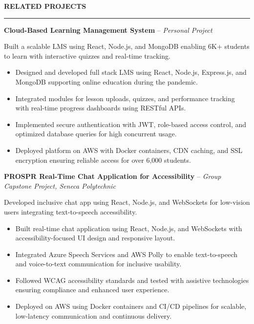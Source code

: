 \documentclass[10pt,letterpaper]{article}
\begin{document}
\vspace{6pt}

\textbf{RELATED PROJECTS}\\[-8pt]
\noindent\rule{\textwidth}{1pt}

\vspace{-2pt}

\textbf{Cloud-Based Learning Management System} -- \emph{Personal Project}

\vspace{-1pt}

Built a scalable LMS using React, Node.js, and MongoDB enabling 6K+ students to learn with interactive quizzes and real-time tracking.
\vspace{-1pt}
\begin{itemize}
\item Designed and developed full stack LMS using React, Node.js, Express.js, and MongoDB supporting online education during the pandemic.
\item Integrated modules for lesson uploads, quizzes, and performance tracking with real-time progress dashboards using RESTful APIs.
\item Implemented secure authentication with JWT, role-based access control, and optimized database queries for high concurrent usage.
\item Deployed platform on AWS with Docker containers, CDN caching, and SSL encryption ensuring reliable access for over 6,000 students.
\end{itemize}

\textbf{PROSPR  Real-Time Chat Application for Accessibility} -- \emph{Group Capstone Project, Seneca Polytechnic}

\vspace{-1pt}

Developed inclusive chat app using React, Node.js, and WebSockets for low-vision users integrating text-to-speech accessibility.
\vspace{-1pt}
\begin{itemize}
\item Built real-time chat application using React, Node.js, and WebSockets with accessibility-focused UI design and responsive layout.
\item Integrated Azure Speech Services and AWS Polly to enable text-to-speech and voice-to-text communication for inclusive usability.
\item Followed WCAG accessibility standards and tested with assistive technologies ensuring compliance and enhanced user experience.
\item Deployed on AWS using Docker containers and CI/CD pipelines for scalable, low-latency communication and continuous delivery.
\end{itemize}
\end{document}
